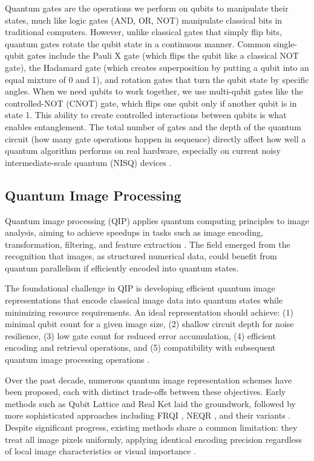 \documentclass{ipol}
\begin{document}
Quantum gates are the operations we perform on qubits to manipulate their states, much like logic gates (AND, OR, NOT) manipulate classical bits in traditional computers. However, unlike classical gates that simply flip bits, quantum gates rotate the qubit state in a continuous manner. Common single-qubit gates include the Pauli X gate (which flips the qubit like a classical NOT gate), the Hadamard gate (which creates superposition by putting a qubit into an equal mixture of 0 and 1), and rotation gates that turn the qubit state by specific angles. When we need qubits to work together, we use multi-qubit gates like the controlled-NOT (CNOT) gate, which flips one qubit only if another qubit is in state 1. This ability to create controlled interactions between qubits is what enables entanglement. The total number of gates and the depth of the quantum circuit (how many gate operations happen in sequence) directly affect how well a quantum algorithm performs on real hardware, especially on current noisy intermediate-scale quantum (NISQ) devices \cite{bib9,bib10,bib11}.

\subsection{Quantum Image Processing}

Quantum image processing (QIP) applies quantum computing principles to image analysis, aiming to achieve speedups in tasks such as image encoding, transformation, filtering, and feature extraction \cite{bib12,bib13}. The field emerged from the recognition that images, as structured numerical data, could benefit from quantum parallelism if efficiently encoded into quantum states.

The foundational challenge in QIP is developing efficient quantum image representations that encode classical image data into quantum states while minimizing resource requirements. An ideal representation should achieve: (1) minimal qubit count for a given image size, (2) shallow circuit depth for noise resilience, (3) low gate count for reduced error accumulation, (4) efficient encoding and retrieval operations, and (5) compatibility with subsequent quantum image processing operations \cite{bib14,bib15}.

Over the past decade, numerous quantum image representation schemes have been proposed, each with distinct trade-offs between these objectives. Early methods such as Qubit Lattice \cite{bib16} and Real Ket \cite{bib17} laid the groundwork, followed by more sophisticated approaches including FRQI \cite{bib18}, NEQR \cite{bib19}, and their variants \cite{bib20,bib21,bib22,bib23}. Despite significant progress, existing methods share a common limitation: they treat all image pixels uniformly, applying identical encoding precision regardless of local image characteristics or visual importance \cite{bib24,bib25}.
\end{document}
